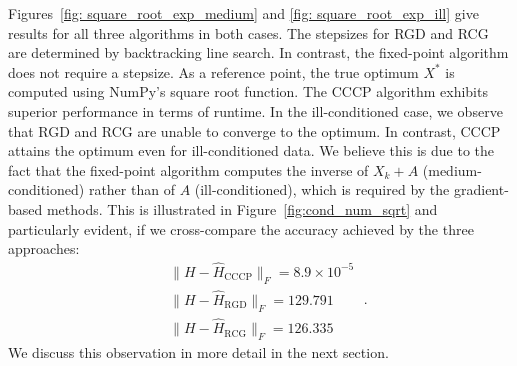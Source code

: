 \documentclass[sn-nature]{sn-jnl}%
\theoremstyle{thmstyleone}%
\theoremstyle{thmstyletwo}%
\theoremstyle{thmstylethree}%
\begin{document}
Figures~\ref{fig: square_root_exp_medium} and \ref{fig: square_root_exp_ill} give results for all three algorithms in both cases. The stepsizes for RGD and RCG are determined by backtracking line search. In contrast, the fixed-point algorithm does not require a stepsize. As a reference point, the true optimum $X^*$ is computed using NumPy's square root function. The CCCP algorithm exhibits superior performance in terms of runtime. In the ill-conditioned case, we observe that RGD and RCG are unable to converge to the optimum. In contrast, CCCP attains the optimum even for ill-conditioned data. We believe this is due to the fact that the fixed-point algorithm computes the inverse of $X_k + A$ (medium-conditioned) rather than of $A$ (ill-conditioned), which is required by the gradient-based methods. This is illustrated in Figure~\ref{fig:cond_num_sqrt} and particularly evident, if we cross-compare the accuracy achieved by the three approaches:
\[
\begin{aligned}
    &\|H - \hat{H}_{\operatorname{CCCP}}\|_{F} = 8.9 \times 10^{-5}
    \\&\|H - \hat{H}_{\operatorname{RGD}}\|_{F} = 129.791
    \\&\|H - \hat{H}_{\operatorname{RCG}}\|_{F} = 126.335 
\end{aligned} \; .
\]
We discuss this observation in more detail in the next section.

\end{document}
